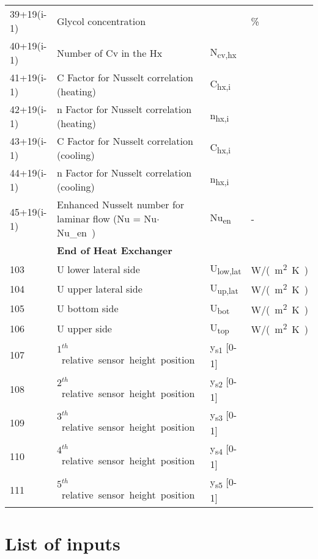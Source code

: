 \documentclass[english]{SPFReport}
\begin{document}
\begin{tabular}{| l |  m{8cm} | l | l |}
   \small{39+19(i-1)}  & Glycol concentration &  &  \%\\
       \small{40+19(i-1)}  & Number of Cv in the Hx  &  \si{N_{cv,hx}} &  \\
    \small{41+19(i-1)}  & C Factor for  Nusselt correlation (heating)  &  \si{C_{hx,i}} & \\
    \small{42+19(i-1)}  & n Factor  for  Nusselt correlation (heating) &  \si{n_{hx,i}} & \\
     \small{43+19(i-1)}  & C Factor  for  Nusselt correlation (cooling)  &  \si{C_{hx,i}} & \\
     \small{44+19(i-1)}  & n Factor  for Nusselt correlation (cooling) &  \si{n_{hx,i}} & \\
\small{45+19(i-1)} & Enhanced Nusselt number for laminar flow (\si{Nu = Nu$\cdot$ Nu_{en}}) & \si{Nu_{en}} & - \\
      & \textbf{End of Heat Exchanger } & & \\
      \hline                                            
103 & U lower lateral side   & \si{U_{low,lat}} & \si{W/(m^2K)}\\
104 &  U upper lateral side   & \si{U_{up,lat}} &  \si{W/(m^2K)}\\
105 & U bottom side   & \si{U_{bot}} &  \si{W/(m^2K)}\\
106 & U upper side   & \si{U_{top}} &  \si{W/(m^2K)}\\
107 & \si{$1^{th}$} relative sensor height position  & \si{y_{s1}} [0-1] & \\
108 & \si{$2^{th}$} relative  sensor height position  & \si{y_{s2}} [0-1]& \\
109 & \si{$3^{th}$} relative sensor height position  & \si{y_{s3}} [0-1]& \\
110 & \si{$4^{th}$} relative sensor height position  & \si{y_{s4}} [0-1]& \\
111 & \si{$5^{th}$} relative sensor height position  & \si{y_{s5}} [0-1]& \\
\hline

\end{tabular}




\section{List of inputs}
\end{document}
